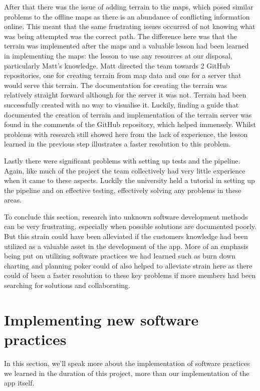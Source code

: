 \documentclass{l3proj}
\begin{document}
After that there was the issue of adding terrain to the maps, which posed similar problems to the offline maps as there is an abundance of conflicting information online.  This meant that the same frustrating issues occurred of not knowing what was being attempted was the correct path.  The difference here was that the terrain was implemented after the maps and a valuable lesson had been learned in implementing the maps: the lesson to use any resources at our disposal, particularly Matt’s knowledge.  Matt directed the team towards 2 GitHub repositories, one for creating terrain from map data\cite{TerrainBuilder} and one for a server that would serve this terrain\cite{TerrainServer}.  The documentation for creating the terrain was relatively straight forward although for the server it was not.  Terrain had been successfully created with no way to visualise it.  Luckily, finding a guide that documented the creation of terrain and implementation of the terrain server was found in the comments of the GitHub repository, which helped immensely\cite{VisualTerrain}.  Whilst problems with research still showed here from the lack of experience, the lesson learned in the previous step illustrates a faster resolution to this problem. \par 
Lastly there were significant problems with setting up tests and the pipeline.  Again, like much of the project the team collectively had very little experience when it came to these aspects.  Luckily the university held a tutorial in setting up the pipeline and on effective testing, effectively solving any problems in these areas. \par
To conclude this section, research into unknown software development methods can be very frustrating, especially when possible solutions are documented poorly.  But this strain could have been alleviated if the customers knowledge had been utilized as a valuable asset in the development of the app.  More of an emphasis being put on utilizing software practices we had learned such as burn down charting and planning poker could of also helped to alleviate strain here as there could of been a faster resolution to these key problems if more members had been searching for solutions and collaborating.



\label{sec:Practices}
\section{Implementing new software practices}
In this section, we’ll speak more about the implementation of software practices we learned in the duration of this project, more than our implementation of the app itself.
\end{document}
